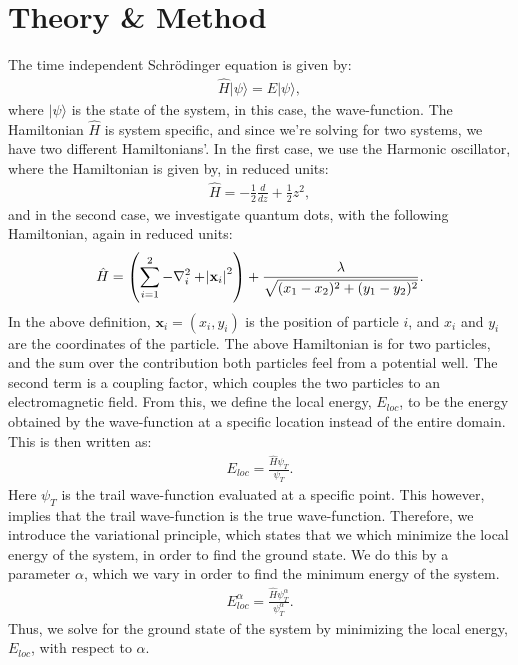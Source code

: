 \documentclass[a4paper]{article}
\newcommand{\laplace}{\nabla^2}
\newcommand{\ket}[1]{|#1\rangle}
\begin{document}
\section{Theory \& Method}
The time independent Schrödinger equation is given by:
\begin{align*}
    \hat{H}\ket{\psi} = E\ket{\psi},
\end{align*}where $\ket{\psi}$ is the state of the system, in this case, the wave-function.
The Hamiltonian $\hat{H}$ is system specific, and since we're solving for two systems, we have two different Hamiltonians'.
In the first case, we use the Harmonic oscillator, where the Hamiltonian is given by, in reduced units:
\begin{align}
    \hat{H} = -\frac{1}{2}\frac{d}{dz} + \frac{1}{2}z^2,\label{eq: harmonic_oscillator Hamiltonian} 
\end{align}and in the second case, we investigate quantum dots, with the following Hamiltonian, again in reduced units:
\begin{align}
    \hat{H} = \left(\sum_{i = 1}^2 -\laplace_i + \abs{\mathbf{x}_i}^2\right) + \frac{\lambda}{\sqrt{(x_1 - x_2)^2 + (y_1 - y_2)^2}}.\label{eq: quantum dots Hamiltonian}
\end{align}In the above definition, $\mathbf{x}_i = (x_i, y_i)$ is the position of particle $i$, and $x_i$ and $y_i$ are the coordinates of the particle.
The above Hamiltonian is for two particles, and the sum over the contribution both particles feel from a potential well.
The second term is a coupling factor, which couples the two particles to an electromagnetic field.
From this, we define the local energy, $E_{loc}$, to be the energy obtained by the wave-function at a specific location instead of the entire domain. This is then written as:
\begin{align*}
    E_{loc} = \frac{\hat{H}\psi_T}{\psi_T}.
\end{align*}Here $\psi_T$ is the trail wave-function evaluated at a specific point.
This however, implies that the trail wave-function is the true wave-function.
Therefore, we introduce the variational principle, which states that we which minimize the local energy of the system, in order to find the ground state.
We do this by a parameter $\alpha$, which we vary in order to find the minimum energy of the system.
\begin{align}
    E_{loc}^\alpha = \frac{\hat{H}\psi_T^\alpha}{\psi_T^\alpha}. \label{eq: local energy minimize}
\end{align}Thus, we solve for the ground state of the system by minimizing the local energy, $E_{loc}$, with respect to $\alpha$.
\end{document}
